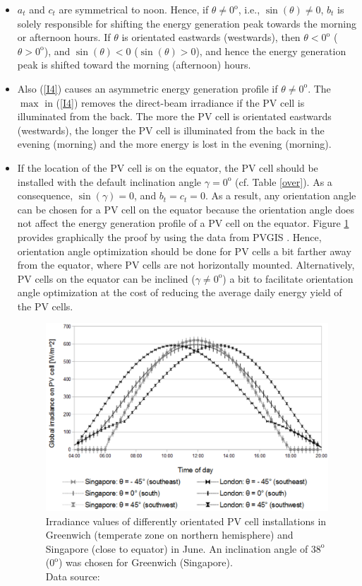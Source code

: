 \begin{itemize}
\item $a_t$ and $c_t$ are symmetrical to noon. Hence, if $\theta\neq 0^\mathrm{o}$, i.e., $\sin(\theta)\neq 0$, $b_t$ is solely responsible for shifting the energy generation peak towards the morning or afternoon hours. If $\theta$ is orientated eastwards (westwards), then $\theta<0^{\mathrm{o}}$ ($\theta>0^{\mathrm{o}}$), and $\sin(\theta)< 0$ ($\sin(\theta)> 0$), and hence the energy generation peak is shifted toward the morning (afternoon) hours.
\item Also (\ref{I4}) causes an asymmetric energy generation profile if $\theta\neq0^{\mathrm{o}}$. The $\max$ in (\ref{I4}) removes the direct-beam irradiance if the PV cell is illuminated from the back. The more the PV cell is orientated eastwards (westwards), the longer the PV cell is illuminated from the back in the evening (morning) and the more energy is lost in the evening (morning).
\item If the location of the PV cell is on the equator, the PV cell should be installed with the default inclination angle $\gamma=0^\mathrm{o}$ (cf. Table \ref{over}). As a consequence, $\sin(\gamma)=0$, and $b_t=c_t=0$. As a result, any orientation angle can be chosen for a PV cell on the equator because the orientation angle does not affect the energy generation profile of a PV cell on the equator. Figure \ref{fig:June} provides graphically the proof by using the data from PVGIS \cite{PVGIS}.
Hence, orientation angle optimization should be done for PV cells a bit farther away from the equator, where PV cells are not horizontally mounted. Alternatively, PV cells on the equator can be inclined ($\gamma\neq 0^\mathrm{o}$) a bit to facilitate orientation angle optimization at the cost of reducing the average daily energy yield of the PV cells.

\begin{figure}[H]
	\centering
		\includegraphics[width=\columnwidth]{pictures/lon-sin}
\caption[Irradiance values of differently oriented PV cells in Greenwich (London, UK) and Singapore]{Irradiance values of differently orientated PV cell installations in Greenwich (temperate zone on northern hemisphere) and Singapore (close to equator) in June. An inclination angle of $38^{\mathrm{o}}$ ($0^{\mathrm{o}}$) was chosen for Greenwich (Singapore).\\ Data source: \cite{PVGIS} \label{fig:June}}


\end{figure}
\end{itemize}
